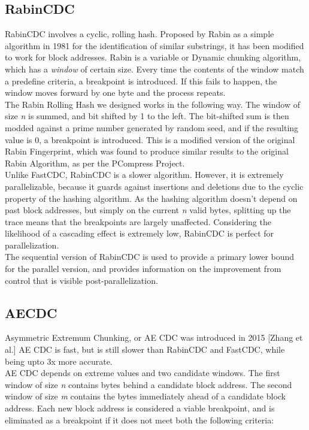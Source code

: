 \documentclass{acmtog} %
\begin{document}
	\subsection{RabinCDC}
	RabinCDC involves a cyclic, rolling hash. Proposed by Rabin as a simple algorithm in 1981 for the identification of similar substrings, it has been modified to work for block addresses. Rabin is a variable or Dynamic chunking algorithm, which has a \textit{window} of certain size. Every time the contents of the window match a predefine criteria, a breakpoint is introduced. If this fails to happen, the window moves forward by one byte and the process repeats.\\
	
	The Rabin Rolling Hash we designed works in the following way. The window of size \textit{n} is summed, and bit shifted by 1 to the left. The bit-shifted sum is then modded against a prime number generated by random seed, and if the resulting value is 0, a breakpoint is introduced. This is a modified version of the original Rabin Fingerprint, which was found to produce similar results to the original Rabin Algorithm, as per the PCompress Project.\\ 

	Unlike FastCDC, RabinCDC is a slower algorithm. However, it is extremely parallelizable, because it guards against insertions and deletions due to the cyclic property of the hashing algorithm. As the hashing algorithm doesn't depend on past block addresses, but simply on the current \textit{n} valid bytes, splitting up the trace means that the breakpoints are largely unaffected. Considering the likelihood of a cascading effect is extremely low, RabinCDC is perfect for parallelization.\\
	
	The sequential version of RabinCDC is used to provide a primary lower bound for the parallel version, and provides information on the improvement from control that is visible post-parallelization.\\
	
	\subsection{AECDC}
	Asymmetric Extremum Chunking, or AE CDC was introduced in 2015 [Zhang et al.] AE CDC is fast, but is still slower than RabinCDC and FastCDC, while being upto 3x more accurate.\\
	
	AE CDC depends on extreme values and two candidate windows. The first window of size \textit{n} contains bytes behind a candidate block address. The second window of size \textit{m} contains the bytes immediately ahead of a candidate block address. Each new block address is considered a viable breakpoint, and is eliminated as a breakpoint if it does not meet both the following criteria:
	
\end{document}

